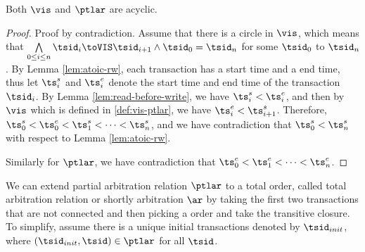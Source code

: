 \begin{lem}
    \label{lem:semi-acyclic}
    Both \( \vis \) and \( \ptlar \) are acyclic.
\end{lem}
\begin{proof}
    Proof by contradiction.
    Assume that there is a circle in \( \vis \), which means that \( \bigwedge\limits_{0 \leq i \leq n} \tsid_{i} \toVIS \tsid_{i+1} \land \tsid_{0} = \tsid_{n} \) for some \( \tsid_{0} \) to \( \tsid_{n}\).
    By Lemma \ref{lem:atoic-rw}, each transaction has a start time and a end time, thus let \( \ts^{s}_{i} \) and \( \ts^{e}_{i} \) denote the start time and end time of the transaction \( \tsid_{i} \).
    By Lemma \ref{lem:read-before-write}, we have \( \ts^{s}_{i} < \ts^{e}_{i} \), and  then by \( \vis \) which is defined in  \ref{def:vis-ptlar}, we have \( \ts^{e}_{i} < \ts^{s}_{i+1} \).
    Therefore, \( \ts^{s}_{0} < \ts^{e}_{0} < \ts^{s}_{1} < \dots <  \ts^{s}_{n} \), and we have contradiction that \( \ts^{s}_{0} < \ts^{s}_{n} \) with respect to Lemma \ref{lem:atoic-rw}.

    Similarly for \( \ptlar \), we have contradiction that \( \ts^{e}_{0} < \ts^{e}_{1} < \dots  < \ts^{e}_{n} \).
\end{proof}

We can extend partial arbitration relation \( \ptlar \) to a total order, called total arbitration relation or shortly arbitration \( \ar \) by taking the first two transactions that are not connected and then picking a order and take the transitive closure.
To simplify, assume there is a unique initial transactions denoted by \( \tsid_{init} \), where \( (\tsid_{init}, \tsid) \in \ptlar \) for all \( \tsid \).

